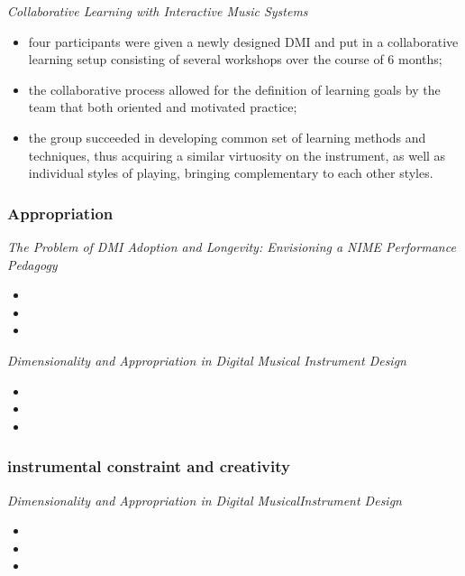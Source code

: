 \documentclass[11pt]{article}
\begin{document}
\textit{Collaborative Learning with Interactive Music Systems} \citep{marquez-borbon_collaborative_2020}
\begin{itemize}
    \item four participants were given a newly designed DMI and put in a collaborative learning setup consisting of several workshops over the course of 6 months;
    \item the collaborative process allowed for the definition of learning goals by the team that both oriented and motivated practice;
    \item the group succeeded in developing common set of learning methods and techniques, thus acquiring a similar virtuosity on the instrument, as well as individual styles of playing, bringing complementary to each other styles.
\end{itemize}


\subsubsection{Appropriation}
\textit{The Problem of DMI Adoption and Longevity: Envisioning a NIME Performance Pedagogy} \citep{marquez-borbon_problem_2018}
\begin{itemize}
    \item 
    \item 
    \item 
\end{itemize}

\textit{Dimensionality and Appropriation in Digital Musical Instrument Design} \citep{zappi_dimensionality_2014}
\begin{itemize}
    \item 
    \item 
    \item 
\end{itemize}


\subsubsection{instrumental constraint and creativity}
\textit{Dimensionality and Appropriation in Digital MusicalInstrument Design} \citep{zappi_dimensionality_2014}
\begin{itemize}
    \item 
    \item 
    \item 
\end{itemize}
\end{document}

